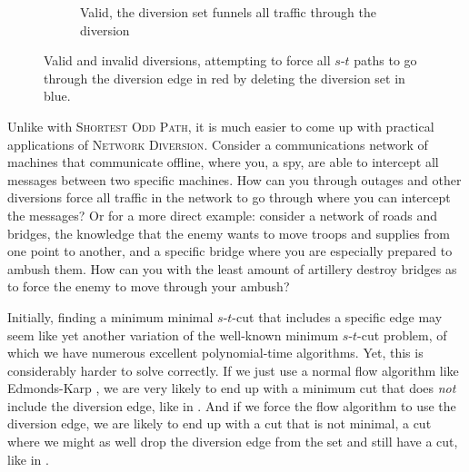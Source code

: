 \begin{figure}[H]
\begin{subfigure}{.3\textwidth}
        \caption{Valid, the diversion set funnels all traffic through the diversion}
        \label{subfigure:valid-diversion}
    \end{subfigure}
    \caption{Valid and invalid diversions, attempting to force all $s$-$t$ paths to go through the diversion edge in red by deleting the diversion set in blue.}
    \label{figure:diversion-attempts}
\end{figure}

Unlike with \textsc{Shortest Odd Path}, it is much easier to come up with practical applications of \textsc{Network Diversion}. Consider a communications network of machines that communicate offline, where you, a spy, are able to intercept all messages between two specific machines. How can you through outages and other diversions force all traffic in the network to go through where you can intercept the messages? Or for a more direct example: consider a network of roads and bridges, the knowledge that the enemy wants to move troops and supplies from one point to another, and a specific bridge where you are especially prepared to ambush them. How can you with the least amount of artillery destroy bridges as to force the enemy to move through your ambush?


Initially, finding a minimum minimal $s$-$t$-cut that includes a specific edge may seem like yet another variation of the well-known minimum $s$-$t$-cut problem, of which we have numerous excellent polynomial-time algorithms. Yet, this is considerably harder to solve correctly. If we just use a normal flow algorithm like Edmonds-Karp \cite{source:edmonds-karp-algorithn}, we are very likely to end up with a minimum cut that does \emph{not} include the diversion edge, like in . And if we force the flow algorithm to use the diversion edge, we are likely to end up with a cut that is not minimal, a cut where we might as well drop the diversion edge from the set and still have a cut, like in .

